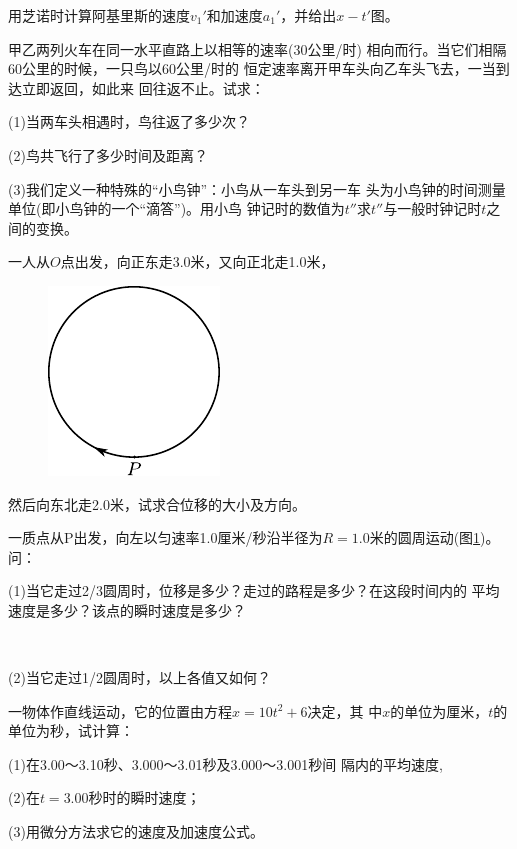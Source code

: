 \exercises

\exercise 用芝诺时计算阿基里斯的速度$v_1'$和加速度$a_1'$，并给出$x-t'$图。

\exercise 甲乙两列火车在同一水平直路上以相等的速率(30公里/时)
相向而行。当它们相隔60公里的时候，一只鸟以60公里/时的
恒定速率离开甲车头向乙车头飞去，一当到达立即返回，如此来
回往返不止。试求：

(1)当两车头相遇时，鸟往返了多少次？

(2)鸟共飞行了多少时间及距离？

(3)我们定义一种特殊的“小鸟钟”：小鸟从一车头到另一车
头为小鸟钟的时间测量单位(即小鸟钟的一个“滴答”)。用小鸟
钟记时的数值为$t''$求$t''$与一般时钟记时$t$之间的变换。

\exercise 一人从$O$点出发，向正东走3.0米，又向正北走1.0米，
\begin{figure}
    \begin{center}
        \includegraphics{figure/fig01.28}
        \caption{}
        \label{fig:01.28}
    \end{center}
\end{figure}
然后向东北走2.0米，试求合位移的大小及方向。

\exercise 一质点从P出发，向左以匀速率1.0厘米/秒沿半径为$R=1.0$米的圆周运动(图\ref{fig:01.28})。问：

(1)当它走过2/3圆周时，位移是多少？走过的路程是多少？在这段时间内的
平均速度是多少？该点的瞬时速度是多少？

~\vspace{-1.8em}

(2)当它走过1/2圆周时，以上各值又如何？

\exercise 一物体作直线运动，它的位置由方程$x=10t^2+6$决定，其
中$x$的单位为厘米，$t$的单位为秒，试计算：

(1)在3.00～3.10秒、3.000～3.01秒及3.000～3.001秒间
隔内的平均速度,

(2)在$t=3.00$秒时的瞬时速度；

(3)用微分方法求它的速度及加速度公式。

